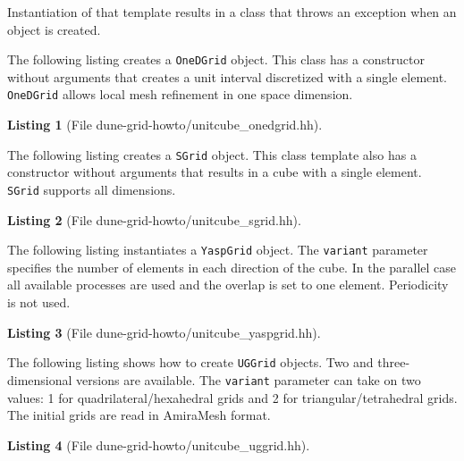 \documentclass[11pt,a4paper,headinclude,footinclude,DIV16,normalheadings]{scrreprt}
\newtheorem{lst}{Listing}
\begin{document}
Instantiation of that template results in a class that throws an
exception when an object is created.


The following listing creates a \lstinline!OneDGrid! object. This
class has a constructor without arguments that creates a unit
interval discretized with a single element. \lstinline!OneDGrid!
allows local mesh refinement in one space dimension.

\begin{lst}[File dune-grid-howto/unitcube\_onedgrid.hh] \mbox{}
\nopagebreak

\end{lst}


The following listing creates a \lstinline!SGrid! object. This class
template also has a constructor without arguments that results in a
cube with a single element. \lstinline!SGrid! supports all dimensions.

\begin{lst}[File dune-grid-howto/unitcube\_sgrid.hh] \mbox{}
\nopagebreak

\end{lst}


The following listing instantiates a \lstinline!YaspGrid! object. The
\lstinline!variant! parameter specifies the number of elements in each
direction of the cube. In the parallel case all available processes
are used and the overlap is set to one element. Periodicity is not
used.  

\begin{lst}[File dune-grid-howto/unitcube\_yaspgrid.hh] \mbox{}
\nopagebreak

\end{lst}


The following listing shows how to create \lstinline!UGGrid!
objects. Two and three-dimensional versions are available. The
\lstinline!variant! parameter can take on two values: 1 for
quadrilateral/hexahedral grids and 2 for triangular/tetrahedral
grids. The initial grids are read in AmiraMesh format.

\begin{lst}[File dune-grid-howto/unitcube\_uggrid.hh] \mbox{}
\nopagebreak

\end{lst}
\end{document}

